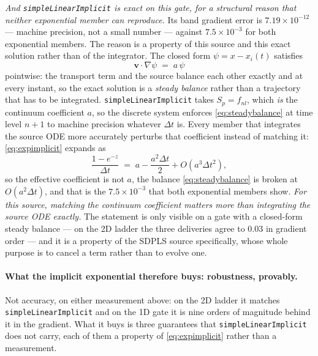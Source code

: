 \documentclass[preprint,3p,11pt]{elsarticle}
\newcommand{\psilev}{\psi}
\begin{document}
\emph{And \texttt{simpleLinearImplicit} is exact on this gate, for a structural
reason that neither exponential member can reproduce.} Its band gradient error is
$7.19\times10^{-12}$ --- machine precision, not a small number --- against
$7.5\times10^{-3}$ for both exponential members. The reason is a property of this
source and this exact solution rather than of the integrator. The closed form
$\psilev = x - x_i(t)$ satisfies
\begin{equation}
  \mathbf{v}\cdot\nabla\psilev \;=\; a\,\psilev
  \label{eq:steadybalance}
\end{equation}
pointwise: the transport term and the source balance each other exactly and at
every instant, so the exact solution is a \emph{steady balance} rather than a
trajectory that has to be integrated. \texttt{simpleLinearImplicit} takes
$S_p = f_{nl}$, which \emph{is} the continuum coefficient $a$, so the discrete
system enforces \eqref{eq:steadybalance} at time level $n+1$ to machine precision
whatever $\Delta t$ is. Every member that integrates the source ODE more
accurately perturbs that coefficient instead of matching it:
\eqref{eq:expimplicit} expands as
\begin{equation}
  \frac{1 - e^{-z}}{\Delta t} \;=\; a - \frac{a^{2}\Delta t}{2} + O(a^{3}\Delta t^{2}),
  \label{eq:effectivecoeff}
\end{equation}
so the effective coefficient is not $a$, the balance \eqref{eq:steadybalance} is
broken at $O(a^{2}\Delta t)$, and that is the $7.5\times10^{-3}$ that both
exponential members show. \emph{For this source, matching the continuum
coefficient matters more than integrating the source ODE exactly.} The statement
is only visible on a gate with a closed-form steady balance --- on the 2D ladder
the three deliveries agree to $0.03$ in gradient order --- and it is a property of
the SDPLS source specifically, whose whole purpose is to cancel a term rather than
to evolve one.

\paragraph{What the implicit exponential therefore buys: robustness, provably.}
Not accuracy, on either measurement above: on the 2D ladder it matches
\texttt{simpleLinearImplicit} and on the 1D gate it is nine orders of magnitude
behind it in the gradient. What it buys is three guarantees that
\texttt{simpleLinearImplicit} does not carry, each of them a property of
\eqref{eq:expimplicit} rather than a measurement.
\end{document}
